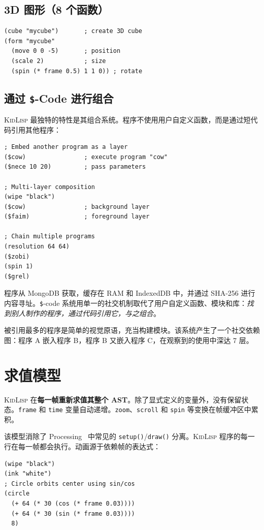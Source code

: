 \documentclass[10pt,letterpaper,twocolumn]{article}
\newcommand{\kl}{\textsc{KidLisp}}
\begin{document}
\subsection{3D 图形（8 个函数）}

\begin{lstlisting}
(cube "mycube")       ; create 3D cube
(form "mycube"
  (move 0 0 -5)       ; position
  (scale 2)           ; size
  (spin (* frame 0.5) 1 1 0)) ; rotate
\end{lstlisting}

\subsection{通过 \texttt{\$}-Code 进行组合}

\kl{} 最独特的特性是其组合系统。程序不使用用户自定义函数，而是通过短代码引用其他程序：

\begin{lstlisting}
; Embed another program as a layer
($cow)                ; execute program "cow"
($nece 10 20)         ; pass parameters

; Multi-layer composition
(wipe "black")
($cow)                ; background layer
($faim)               ; foreground layer

; Chain multiple programs
(resolution 64 64)
($zobi)
(spin 1)
($grel)
\end{lstlisting}

程序从 MongoDB 获取，缓存在 RAM 和 IndexedDB 中，并通过 SHA-256 进行内容寻址。\texttt{\$}-code 系统用单一的社交机制取代了用户自定义函数、模块和库：\emph{找到别人制作的程序，通过代码引用它，与之组合}。

被引用最多的程序是简单的视觉原语，充当构建模块。该系统产生了一个社交依赖图：程序 A 嵌入程序 B，程序 B 又嵌入程序 C，在观察到的使用中深达 7 层。

\section{求值模型}

\kl{} 在\textbf{每一帧重新求值其整个 AST}。除了显式定义的变量外，没有保留状态。\texttt{frame} 和 \texttt{time} 变量自动递增。\texttt{zoom}、\texttt{scroll} 和 \texttt{spin} 等变换在帧缓冲区中累积。

该模型消除了 Processing~\citep{reas2007processing} 中常见的 \texttt{setup()}/\texttt{draw()} 分离。\kl{} 程序的每一行在每一帧都会执行。动画源于依赖帧的表达式：

\begin{lstlisting}
(wipe "black")
(ink "white")
; Circle orbits center using sin/cos
(circle
  (+ 64 (* 30 (cos (* frame 0.03))))
  (+ 64 (* 30 (sin (* frame 0.03))))
  8)
\end{lstlisting}
\end{document}
